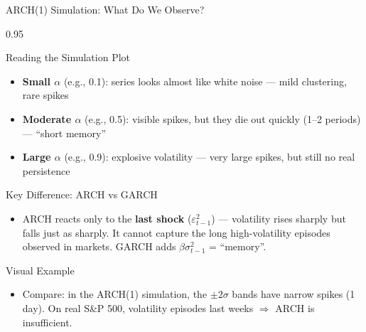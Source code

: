 \documentclass[9pt, aspectratio=169, t]{beamer}
\begin{document}
\begin{frame}{ARCH(1) Simulation: What Do We Observe?}
    \begin{cminipage}{0.95\textwidth}
    {\footnotesize
        \begin{block}{Reading the Simulation Plot}
            \begin{itemize}\setlength{\itemsep}{0pt}
                \item \textbf{Small $\alpha$} (e.g., 0.1): series looks almost like white noise --- mild clustering, rare spikes
                \item \textbf{Moderate $\alpha$} (e.g., 0.5): visible spikes, but they die out quickly (1--2 periods) --- ``short memory''
                \item \textbf{Large $\alpha$} (e.g., 0.9): explosive volatility --- very large spikes, but still no real persistence
            \end{itemize}
        \end{block}
        \begin{alertblock}{Key Difference: ARCH vs GARCH}
            \begin{itemize}\setlength{\itemsep}{0pt}
                \item ARCH reacts only to the \textbf{last shock} ($\varepsilon_{t-1}^2$) --- volatility rises sharply but falls just as sharply. It cannot capture the long high-volatility episodes observed in markets. GARCH adds $\beta\sigma_{t-1}^2$ = ``memory''.
            \end{itemize}
        \end{alertblock}
        \begin{exampleblock}{Visual Example}
            \begin{itemize}\setlength{\itemsep}{0pt}
                \item Compare: in the ARCH(1) simulation, the $\pm 2\sigma$ bands have narrow spikes (1 day). On real S\&P 500, volatility episodes last weeks $\Rightarrow$ ARCH is insufficient.
            \end{itemize}
        \end{exampleblock}
    }
    \end{cminipage}
\end{frame}
\end{document}
